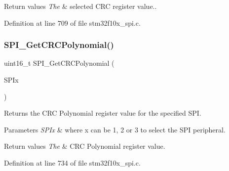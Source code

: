 \begin{DoxyRetVals}{Return values}
{\em The} & selected C\+RC register value.. \\
\hline
\end{DoxyRetVals}


Definition at line 709 of file stm32f10x\+\_\+spi.\+c.

\mbox{\label{group___s_p_i___private___functions_ga80fb9374cfce670f29128bb78568353f}} 
\subsubsection{\texorpdfstring{S\+P\+I\+\_\+\+Get\+C\+R\+C\+Polynomial()}{SPI\_GetCRCPolynomial()}}
{\footnotesize\ttfamily uint16\+\_\+t S\+P\+I\+\_\+\+Get\+C\+R\+C\+Polynomial (\begin{DoxyParamCaption}\item[{\hyperlink{struct_s_p_i___type_def}{S\+P\+I\+\_\+\+Type\+Def} $\ast$}]{S\+P\+Ix }\end{DoxyParamCaption})}



Returns the C\+RC Polynomial register value for the specified S\+PI. 


\begin{DoxyParams}{Parameters}
{\em S\+P\+Ix} & where x can be 1, 2 or 3 to select the S\+PI peripheral. \\
\hline
\end{DoxyParams}

\begin{DoxyRetVals}{Return values}
{\em The} & C\+RC Polynomial register value. \\
\hline
\end{DoxyRetVals}


Definition at line 734 of file stm32f10x\+\_\+spi.\+c.

\mbox{\label{group___s_p_i___private___functions_ga3aabd9e2437e213056c0ed9bdfa1a724}} 
